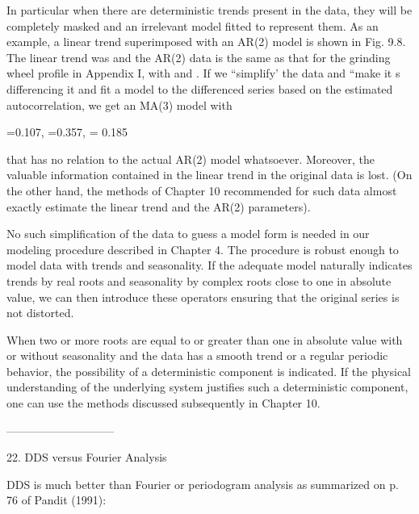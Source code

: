 In particular when there are deterministic trends
present in the data, they will be completely
masked and an irrelevant model fitted to represent
them.  As an example, a linear trend superimposed
with an AR(2) model is shown in Fig.  9.8.  The
linear trend was and the AR(2) data is the same as
that for the grinding wheel profile in Appendix I,
with and . If we ``simplify' the data and ``make
it s differencing it and fit a model to the
differenced series based on the estimated
autocorrelation, we get an MA(3) model with
 
  =0.107,   =0.357,   = 0.185
 
that has no relation to the actual AR(2) model
whatsoever.  Moreover, the valuable information
contained in the linear trend in the original data
is lost.  (On the other hand, the methods of
Chapter 10 recommended for such data almost
exactly estimate the linear trend and the AR(2)
parameters).
 
No such simplification of the data to guess a
model form is needed in our modeling procedure
described in Chapter 4. The procedure is robust
enough to model data with trends and seasonality.
If the adequate model naturally indicates trends
by real roots and seasonality by complex roots
close to one in absolute value, we can then
introduce these operators ensuring that the
original series is not distorted.
 
When two or more roots are equal to or greater
than one in absolute value with or without
seasonality and the data has a smooth trend or a
regular periodic behavior, the possibility of a
deterministic component is indicated.  If the
physical understanding of the underlying system
justifies such a deterministic component, one can
use the methods discussed subsequently in Chapter 10.
 
-----------------------------
 
22. DDS versus Fourier Analysis
 
DDS is much better than Fourier or periodogram
analysis as summarized on p. 76 of Pandit (1991):
 
